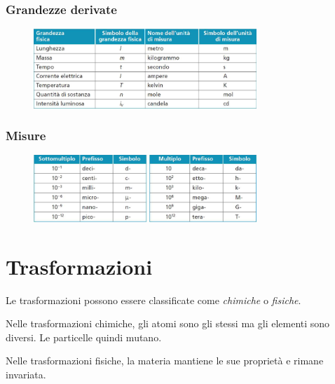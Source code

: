\documentclass[a4paper]{article}
\begin{document}
\subsubsection{Grandezze derivate}

\begin{figure}[h]
    \centering
    \includegraphics[width=0.75\textwidth]{./si.png}
\end{figure}

\pagebreak

\subsubsection{Misure}

\begin{figure}[h]
    \centering
    \includegraphics[width=0.75\textwidth]{./misure.png}
\end{figure}

\pagebreak

\section{Trasformazioni}

Le trasformazioni possono essere classificate come \textit{chimiche} o \textit{fisiche}.


Nelle trasformazioni chimiche, gli atomi sono gli stessi ma gli elementi sono diversi.
Le particelle quindi mutano.


Nelle trasformazioni fisiche, la materia mantiene le sue proprietà e rimane invariata.
\end{document}
